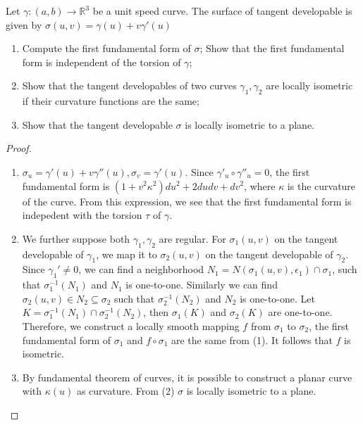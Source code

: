 \begin{problem}
Let $\gamma:(a,b) \to \mathbb{R}^3$ be a unit speed curve. The surface of tangent developable is given by
$\sigma(u,v) = \gamma(u)+v\gamma'(u)$
\begin{enumerate}[label=(\arabic*)]
\item Compute the first fundamental form of $\sigma$; Show that the first fundamental form is independent of the torsion of $\gamma$;
\item Show that the tangent developables of two curves $\gamma_1,\gamma_2$ are locally isometric if their curvature functions are the same;
\item Show that the tangent developable $\sigma$ is locally isometric to a plane.
\end{enumerate}
\end{problem}
\begin{solution}
\begin{proof}\mbox{}
\begin{enumerate}[label=(\arabic*)]
\item $\sigma_u = \gamma'(u)+v\gamma''(u),\sigma_v = \gamma'(u)$. Since $\gamma'_u \circ \gamma''_u =0$, the first fundamental form is $(1+v^2\kappa^2)du^2+2dudv+dv^2$, where $\kappa$ is the curvature of the curve. From this expression, we see that the first fundamental form is indepedent with the torsion $\tau$ of $\gamma$. 
\item We further suppose both $\gamma_1, \gamma_2$ are regular. For $\sigma_1(u,v)$ on the tangent developable of $\gamma_1$, we map it to $\sigma_2(u,v)$ on the tangent developable of $\gamma_2$. 
Since $\gamma_1'\neq 0$, we can find a neighborhood $N_1 = N(\sigma_1(u,v),\epsilon_1)\cap \sigma_1$, such that
$\sigma_1^{-1}(N_1)$ and $N_1$ is one-to-one. 
Similarly we can find $\sigma_2(u,v) \in N_2 \subseteq \sigma_2$ such that $\sigma_2^{-1}(N_2)$ and $N_2$ is one-to-one.
Let $ K = \sigma_1^{-1}(N_1) \cap \sigma_2^{-1}(N_2)$, then $\sigma_1(K)$ and $\sigma_2(K)$ are one-to-one.
Therefore, we construct a locally smooth mapping $f$ from $\sigma_1$ to $\sigma_2$, the first fundamental form of $\sigma_1$ 
and $f\circ \sigma_1$ are the same from (1). It follows that $f$ is isometric.
\item By fundamental theorem of curves, it is possible to construct a planar curve with $\kappa(u)$ as curvature. From (2) $\sigma$ is locally
isometric to a plane. 
\end{enumerate}
\end{proof}
\end{solution}

